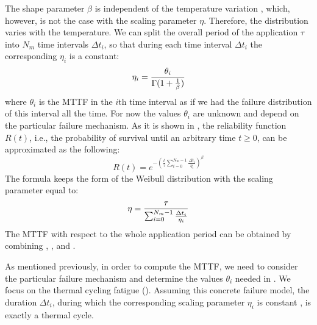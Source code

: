 The shape parameter $\beta$ is independent of the temperature variation
\cite{chang2006}, which, however, is not the case with the scaling parameter
$\eta$. Therefore, the distribution varies with the temperature. We can split
the overall period of the application $\tau$ into $N_m$ time intervals $\Delta
t_i$, so that during each time interval $\Delta t_i$ the corresponding $\eta_i$
is a constant:
\begin{equation} \elab{eta-one}
  \eta_i = \frac{\theta_i}{\Gamma(1 + \frac{1}{\beta})}
\end{equation}
where $\theta_i$ is the MTTF in the $i$th time interval as if we had the failure
distribution of this interval all the time. For now the values $\theta_i$ are
unknown and depend on the particular failure mechanism. As it is shown in
\cite{xiang2010}, the reliability function $R(t)$, i.e., the probability of
survival until an arbitrary time $t \geq 0$, can be approximated as the
following:
\[
  R(t) = e^{-(\frac{t}{\tau} \sum_{i=0}^{N_m - 1} \frac{\Delta t_i}{\eta_i})^\beta}
\]
The formula keeps the form of the Weibull distribution with the scaling
parameter equal to:
\begin{equation} \elab{eta-many}
  \eta = \frac{\tau}{\sum_{i=0}^{N_m - 1} \frac{\Delta t_i}{\eta_i}}
\end{equation}
The MTTF with respect to the whole application period can be obtained by
combining , , and .

As mentioned previously, in order to compute the MTTF, we need to consider the
particular failure mechanism and determine the values $\theta_i$ needed in
. We focus on the thermal cycling fatigue
(). Assuming this concrete failure model, the duration
$\Delta t_i$, during which the corresponding scaling parameter $\eta_i$ is
constant , is exactly a thermal cycle.

